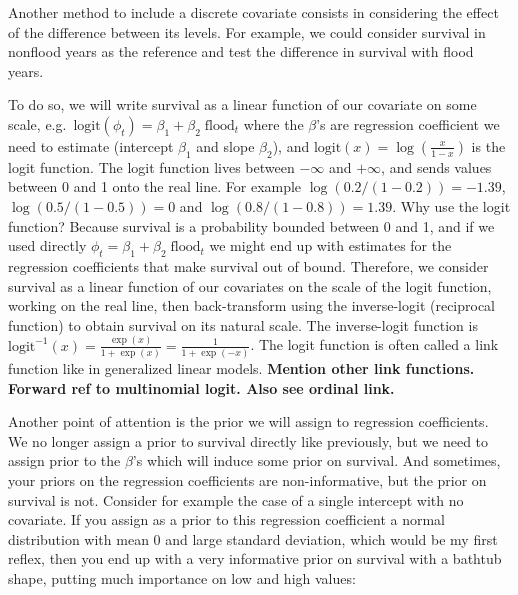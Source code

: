 \documentclass[
  12pt,
]{krantz}
\begin{document}
Another method to include a discrete covariate consists in considering the effect of the difference between its levels. For example, we could consider survival in nonflood years as the reference and test the difference in survival with flood years.

To do so, we will write survival as a linear function of our covariate on some scale, e.g.~\(\text{logit}(\phi_t) = \beta_1 + \beta_2 \;\text{flood}_t\) where the \(\beta\)'s are regression coefficient we need to estimate (intercept \(\beta_1\) and slope \(\beta_2\)), and \(\displaystyle{\text{logit}(x) = \log \left(\frac{x}{1-x}\right)}\) is the logit function. The logit function lives between \(-\infty\) and \(+\infty\), and sends values between 0 and 1 onto the real line. For example \(\log(0.2/(1-0.2))=-1.39\), \(\log(0.5/(1-0.5))=0\) and \(\log(0.8/(1-0.8))=1.39\). Why use the logit function? Because survival is a probability bounded between 0 and 1, and if we used directly \(\phi_t = \beta_1 + \beta_2 \;\text{flood}_t\) we might end up with estimates for the regression coefficients that make survival out of bound. Therefore, we consider survival as a linear function of our covariates on the scale of the logit function, working on the real line, then back-transform using the inverse-logit (reciprocal function) to obtain survival on its natural scale. The inverse-logit function is \(\displaystyle{\text{logit}^{-1}(x) = \frac{\exp(x)}{1+\exp(x)} = \frac{1}{1+\exp(-x)}}\). The logit function is often called a link function like in generalized linear models. \textbf{Mention other link functions. Forward ref to multinomial logit. Also see ordinal link.}

Another point of attention is the prior we will assign to regression coefficients. We no longer assign a prior to survival directly like previously, but we need to assign prior to the \(\beta\)'s which will induce some prior on survival. And sometimes, your priors on the regression coefficients are non-informative, but the prior on survival is not. Consider for example the case of a single intercept with no covariate. If you assign as a prior to this regression coefficient a normal distribution with mean 0 and large standard deviation, which would be my first reflex, then you end up with a very informative prior on survival with a bathtub shape, putting much importance on low and high values:
\end{document}
